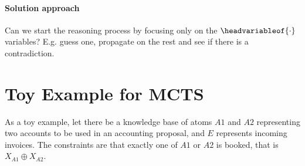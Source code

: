 \documentclass[aps,onecolumn,nofootinbib,pra]{article}
\begin{document}
    \paragraph{Solution approach}
    Can we start the reasoning process by focusing only on the $\headvariableof{\cdot}$ variables?
    E.g. guess one, propagate on the rest and see if there is a contradiction.


    \section{Toy Example for MCTS}

    As a toy example, let there be a knowledge base of atoms $A1$ and $A2$ representing two accounts to be used in an accounting proposal, and $E$ represents incoming invoices.
    The constraints are that exactly one of $A1$ or $A2$ is booked, that is $X_{A1}\oplus X_{A2}$.
\end{document}
